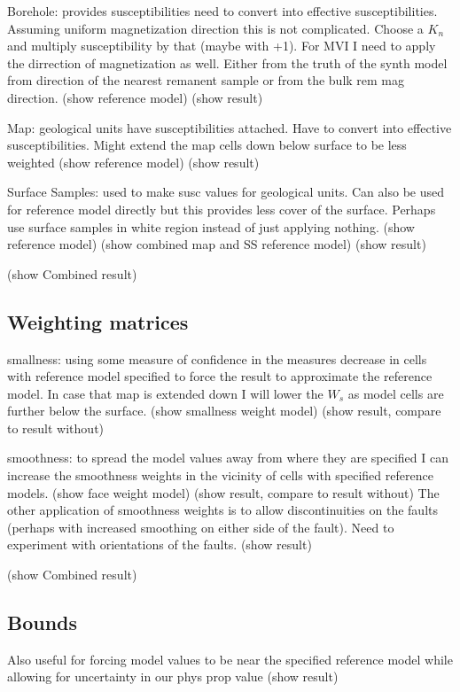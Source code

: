 Borehole: provides susceptibilities need to convert into effective susceptibilities. Assuming uniform magnetization direction this is not complicated. Choose a $K_n$ and multiply susceptibility by that (maybe with +1). For MVI I need to apply the dirrection of magnetization as well. Either from the truth of the synth model from direction of the nearest remanent sample or from the bulk rem mag direction.
(show reference model)
(show result)

Map: geological units have susceptibilities attached. Have to convert into effective susceptibilities. Might extend the map cells down below surface to be less weighted
(show reference model)
(show result)

Surface Samples: used to make susc values for geological units. Can also be used for reference model directly but this provides less cover of the surface. Perhaps use surface samples in white region instead of just applying nothing.
(show reference model)
(show combined map and SS reference model)
(show result)

(show Combined result)

\subsection{Weighting matrices}
\label{sec:Weighting matrices:ElPoma}

smallness: using some measure of confidence in the measures decrease in cells with reference model specified to force the result to approximate the reference model. In case that map is extended down I will lower the $W_s$ as model cells are further below the surface.
(show smallness weight model)
(show result, compare to result without)

smoothness: to spread the model values away from where they are specified I can increase the smoothness weights in the vicinity of cells with specified reference models. 
(show face weight model)
(show result, compare to result without)
The other application of smoothness weights is to allow discontinuities on the faults (perhaps with increased smoothing on either side of the fault). Need to experiment with orientations of the faults.
(show result)

(show Combined result)
\subsection{Bounds}
\label{sec:Bounds:ElPoma}

Also useful for forcing model values to be near the specified reference model while allowing for uncertainty in our phys prop value
(show result)

